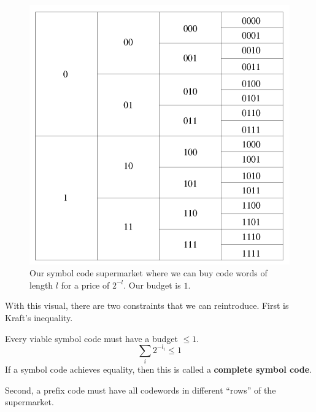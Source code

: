 \documentclass{article}
\begin{document}
    \begin{figure}[H]
      \centering 
      \includegraphics[scale=0.4]{img/supermarket.png}
      \caption{Our symbol code supermarket where we can buy code words of length $l$ for a price of $2^{-l}$. Our budget is $1$. } 
      \label{fig:supermarket}
    \end{figure}

    With this visual, there are two constraints that we can reintroduce. First is Kraft's inequality. 

    \begin{theorem}
      Every viable symbol code must have a budget $\leq 1$. 
      \begin{equation}
        \sum_i 2^{-l_i} \leq 1
      \end{equation}
      If a symbol code achieves equality, then this is called a \textbf{complete symbol code}. 
    \end{theorem}

    Second, a prefix code must have all codewords in different ``rows'' of the supermarket. 
\end{document}

